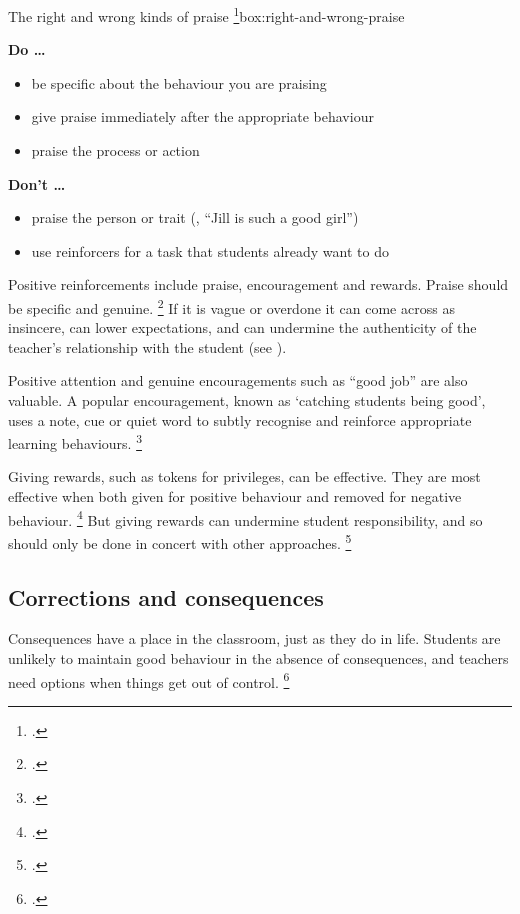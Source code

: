 \documentclass[FrontPage]{grattan}
\begin{document}
\begin{verysmallbox}{The right and wrong kinds of praise%
    \footcites{Epstein2008ReducingBehaviorProblems}{Greenberg2014TrainingOurFuture}}{box:right-and-wrong-praise}

\textbf{Do \dots}
 
 \begin{itemize}
    \item be specific about the behaviour you are praising
    \item give praise immediately after the appropriate behaviour
    \item praise the process or action
\end{itemize}

\textbf{Don't \dots}
\begin{itemize}
    \item praise the person or trait (\eg, ``Jill is such a good girl'')
    \item use reinforcers for a task that students already want to do
\end{itemize}

\end{verysmallbox}

Positive reinforcements include praise, encouragement and rewards. Praise should be specific and genuine.%
    \footcite{Simonsen2008EvidenceBasedPractices}
If it is vague or overdone it can come across as insincere, can lower expectations, and can undermine the authenticity of the teacher's relationship with the student (see ).

Positive attention and genuine encouragements such as ``good job'' are also valuable. A popular encouragement, known as `catching students being good', uses a note, cue or quiet word to subtly recognise and reinforce appropriate learning behaviours.%
    \footcite{Marzano2005HandbookClassroomManagement}
 
Giving rewards, such as tokens for privileges, can be effective. They are most effective when both given for positive behaviour and removed for negative behaviour.%
    \footcite{Marzano2003ClassroomManagementWorks}
But giving rewards can undermine student responsibility, and so should only be done in concert with other approaches.%
    \footcite{Bear2015PreventiveClassroomBased}
 
\subsection{Corrections and consequences}\label{subsec:corrections-and-consequences}
Consequences have a place in the classroom, just as they do in life. Students are unlikely to maintain good behaviour in the absence of consequences, and teachers need options when things get out of control.%
    \footcite{LewisMontuoro2013SelfPredictedClassroom}   
 
\end{document}
